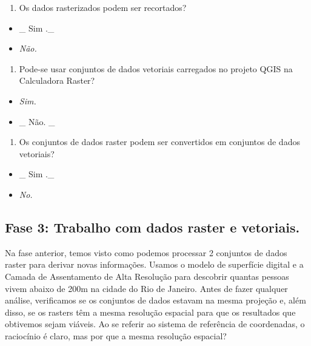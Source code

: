 \documentclass[
]{book}
\providecommand{\tightlist}{%
  \setlength{\itemsep}{0pt}\setlength{\parskip}{0pt}}
\begin{document}
\begin{enumerate}
\def\labelenumi{\arabic{enumi}.}
\tightlist
\item
  Os dados rasterizados podem ser recortados?
\end{enumerate}

\begin{itemize}
\tightlist
\item
  \_ { Sim } .\_
\item
  \emph{Não.}
\end{itemize}

\begin{enumerate}
\def\labelenumi{\arabic{enumi}.}
\setcounter{enumi}{1}
\tightlist
\item
  Pode-se usar conjuntos de dados vetoriais carregados no projeto QGIS na Calculadora Raster?
\end{enumerate}

\begin{itemize}
\tightlist
\item
  \emph{Sim.}
\item
  \_ { Não. } \_
\end{itemize}

\begin{enumerate}
\def\labelenumi{\arabic{enumi}.}
\setcounter{enumi}{2}
\tightlist
\item
  Os conjuntos de dados raster podem ser convertidos em conjuntos de dados vetoriais?
\end{enumerate}

\begin{itemize}
\tightlist
\item
  \_ { Sim } .\_
\item
  \emph{No.}
\end{itemize}

\hypertarget{fase-3-trabalho-com-dados-raster-e-vetoriais.}{%
\subsection{\texorpdfstring{\textbf{Fase 3: Trabalho com dados raster e vetoriais.}}{Fase 3: Trabalho com dados raster e vetoriais.}}\label{fase-3-trabalho-com-dados-raster-e-vetoriais.}}

Na fase anterior, temos visto como podemos processar 2 conjuntos de dados raster para derivar novas informações. Usamos o modelo de superfície digital e a Camada de Assentamento de Alta Resolução para descobrir quantas pessoas vivem abaixo de 200m na \hspace{0pt}\hspace{0pt}cidade do Rio de Janeiro. Antes de fazer qualquer análise, verificamos se os conjuntos de dados estavam na mesma projeção e, além disso, se os rasters têm a mesma resolução espacial para que os resultados que obtivemos sejam viáveis. Ao se referir ao sistema de referência de coordenadas, o raciocínio é claro, mas por que a mesma resolução espacial?
\end{document}
